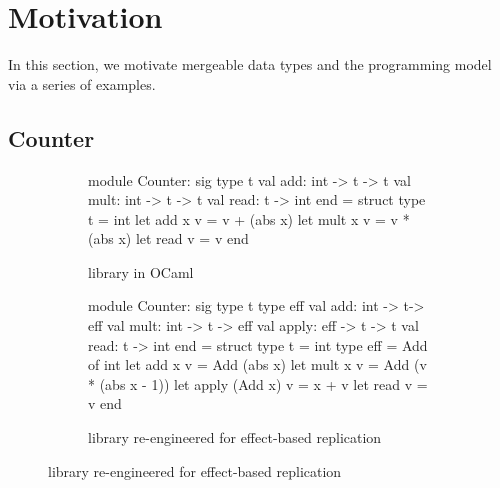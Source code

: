 \section{Motivation}

In this section, we motivate mergeable data types and the \name
programming model via a series of examples.

\subsection{Counter}

\begin{figure}

\begin{subfigure}[b]{0.4\textwidth}
  \begin{ocaml}
    module Counter: sig
      type t
      val add: int -> t -> t
      val mult: int -> t -> t
      val read: t -> int
    end = struct
      type t = int
      let add x v = v + (abs x)
      let mult x v = v * (abs x)
      let read v = v
    end
  \end{ocaml}

\caption{ library in OCaml}
\label{fig:counter-adt}
\end{subfigure}
\begin{subfigure}[b]{0.56\textwidth}
  \begin{ocaml}
    module Counter: sig
      type t
      type eff
      val add: int -> t-> eff
      val mult: int -> t -> eff
      val apply: eff -> t -> t
      val read: t -> int
    end = struct
      type t = int
      type eff = Add of int
      let add x v = Add (abs x)
      let mult x v = Add (v * (abs x - 1))
      let apply (Add x) v = x + v
      let read v = v
    end
  \end{ocaml}

\caption{ library re-engineered for effect-based replication}
\label{fig:counter-rdt}
\end{subfigure}


\end{figure}

